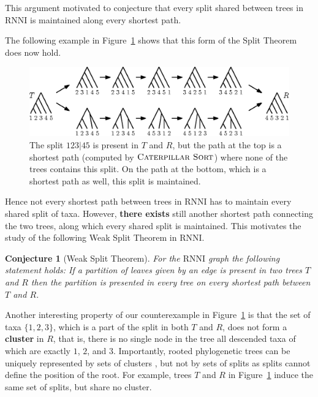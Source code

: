 \documentclass{amsart}
\newcommand{\rnni}{\mathrm{RNNI}}
\newcommand{\csort}{\textsc{Caterpillar Sort}}
\newtheorem{conjecture}[definition]{Conjecture}
\begin{document}
This argument motivated \textcite[Conjecture~9]{Gavryushkin2018-ol} to conjecture that every split shared between trees in $\rnni$ is maintained along every shortest path.

The following example in Figure~\ref{fig:splitthm_counterexample} shows that this form of the Split Theorem does now hold.

\begin{figure}[H]
\centering
\includegraphics[width=\textwidth]{splitthm_counterexample}
\vspace{12pt}
\caption{The split $123|45$ is present in $T$ and $R$, but the path at the top is a shortest path (computed by $\csort$) where none of the trees contains this split.
On the path at the bottom, which is a shortest path as well, this split is maintained.}
\label{fig:splitthm_counterexample}
\end{figure}

Hence not every shortest path between trees in $\rnni$ has to maintain every shared split of taxa.
However, \textbf{there exists} still another shortest path connecting the two trees, along which every shared split is maintained.
This motivates the study of the following Weak Split Theorem in $\rnni$.

\begin{conjecture}[Weak Split Theorem]
For the $\rnni$ graph the following statement holds:
If a partition of leaves given by an edge is present in two trees $T$ and $R$ then the partition is presented in every tree on every shortest path between $T$ and $R$.
\label{conjecture:split_theorem}
\end{conjecture}

Another interesting property of our counterexample in Figure~\ref{fig:splitthm_counterexample} is that the set of taxa $\{1, 2, 3\}$, which is a part of the split in both $T$ and $R$, does not form a \textbf{cluster} in $R$, that is, there is no single node in the tree all descended taxa of which are exactly $1$, $2$, and $3$.
Importantly, rooted phylogenetic trees can be uniquely represented by sets of clusters \autocite{Steel2016-ye}, but not by sets of splits as splits cannot define the position of the root.
For example, trees $T$ and $R$ in Figure~\ref{fig:splitthm_counterexample} induce the same set of splits, but share no cluster.
\end{document}

